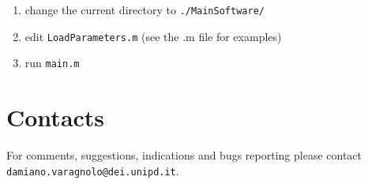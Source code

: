 \documentclass[a4paper, 10pt, twoside]{article} %
\begin{document}
\begin{enumerate}
	\item change the current directory to \texttt{./MainSoftware/}
	\item edit \texttt{LoadParameters.m} (see the .m file for examples)
	\item run \texttt{main.m}
\end{enumerate}


\section{Contacts}
\label{sec:contacts}

For comments, suggestions, indications and bugs reporting please contact \texttt{damiano.varagnolo@dei.unipd.it}.



\end{document}
